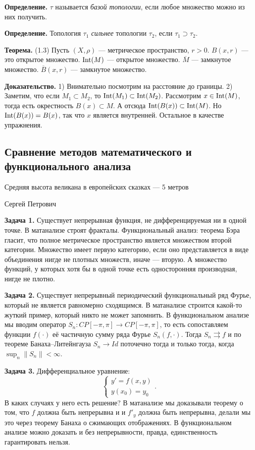 \textbf{Определение.} $\tau$ называется \textit{базой топологии}, если любое множество можно из них получить.

\textbf{Определение.} Топология $\tau_1$ \textit{сильнее} топологии $\tau_2$, если $\tau_1 \supset \tau_2$.

\textbf{Теорема.} (1.3) Пусть $(X, \rho)$ --- метрическое пространство, $r > 0$.
$B(x, r)$ --- это открытое множество.
$\operatorname{Int}(M)$ --- открытое множество.
$\overline M$ --- замкнутое множество.
$\overline B(x, r)$ --- замкнутое множество.

\textbf{Доказательство.} 1) Внимательно посмотрим на расстояние до границы.
2) Заметим, что если $M_1 \subset M_2$, то $\operatorname{Int}(M_1) \subset \operatorname{Int}(M_2)$.
Рассмотрим $x \in \operatorname{Int}(M)$, тогда есть окрестность $B(x) \subset M$.
А отсюда $\operatorname{Int}(B(x)) \subset \operatorname{Int}(M)$.
Но $\operatorname{Int}(B(x)) = B(x)$, так что $x$ является внутренней.
Остальное в качестве упражнения.

\QED

\subsection{Сравнение методов математического и функционального анализа}
\epigraph{Средняя высота великана в европейских сказках --- 5 метров}{Сергей Петрович}

\textbf{Задача 1.} Существует непрерывная функция, не дифференцируемая ни в одной точке.
В матанализе строят фракталы.
Функциональный анализ: теорема Бэра гласит, что полное метрическое пространство является множеством второй категории.
Множество имеет первую категорию, если оно представляется в виде объединения нигде не плотных множеств, иначе --- вторую.
А множество функций, у которых хотя бы в одной точке есть односторонняя производная, нигде не плотно.

\textbf{Задача 2.} Существует непрерывный периодический функциональный ряд Фурье, который не является равномерно сходящимся.
В матанализе строится какой-то жуткий пример, который никто не может запомнить.
В функциональном анализе мы вводим оператор $S_n: CP[-\pi, \pi] \to CP[-\pi, \pi]$, то есть сопоставляем функции $f(\cdot)$ её частичную сумму ряда Фурье $S_n(f, \cdot)$.
Тогда $S_n \rightrightarrows f$ и по теореме Банаха--Литейнгауза $S_n \to Id$ поточечно тогда и только тогда, когда $\sup_n \|S_n\| < \infty$.

\textbf{Задача 3.} Дифференциальное уравнение:
\[
    \begin{cases}
        y' = f(x, y) \\
        y(x_0) = y_0
    \end{cases} .
\]
В каких случаях у него есть решение?
В матанализе мы доказывали теорему о том, что $f$ должна быть непрерывна и и $f'_y$ должна быть непрерывна, делали мы это через теорему Банаха о сжимающих отображениях.
В функциональном анализе можно доказать и без непрерывности, правда, единственность гарантировать нельзя.

